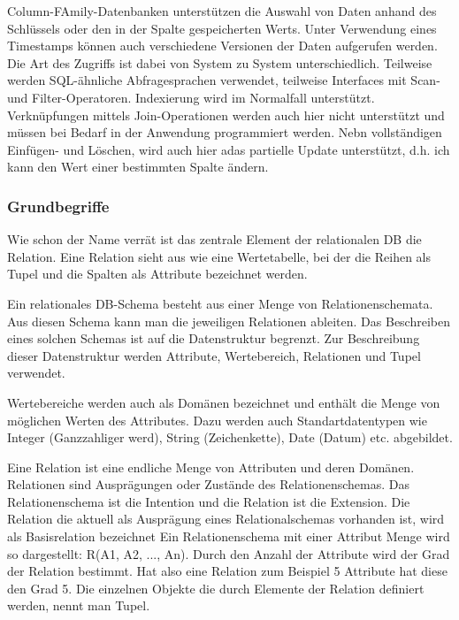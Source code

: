 \begin{flushleft}
Column-FAmily-Datenbanken unterstützen die Auswahl von Daten anhand des Schlüssels oder den in der Spalte gespeicherten Werts. Unter Verwendung eines Timestamps können auch verschiedene Versionen der Daten aufgerufen werden.  Die Art des Zugriffs ist dabei von System zu System unterschiedlich. Teilweise werden SQL-ähnliche Abfragesprachen verwendet, teilweise Interfaces mit Scan- und Filter-Operatoren. Indexierung wird im Normalfall unterstützt. Verknüpfungen mittels Join-Operationen werden auch hier nicht unterstützt und müssen bei Bedarf in der Anwendung programmiert werden. 
Nebn vollständigen Einfügen- und Löschen, wird auch hier adas partielle Update unterstützt, d.h. ich kann den Wert einer bestimmten Spalte ändern. 













\subsubsection{Grundbegriffe}

Wie schon der Name verrät ist das zentrale Element der relationalen DB die Relation. Eine Relation sieht aus wie eine Wertetabelle, bei der die Reihen als Tupel und die Spalten als Attribute bezeichnet werden. 

Ein relationales DB-Schema besteht aus einer Menge von Relationenschemata. Aus diesen Schema kann man die jeweiligen Relationen ableiten. Das Beschreiben eines solchen Schemas ist auf die Datenstruktur begrenzt. 
Zur Beschreibung dieser Datenstruktur werden Attribute, Wertebereich, Relationen und Tupel verwendet.



Wertebereiche werden auch als Domänen bezeichnet und enthält die Menge von möglichen Werten des Attributes. Dazu werden auch Standartdatentypen wie Integer (Ganzzahliger werd), String (Zeichenkette), Date (Datum) etc. abgebildet. 

Eine Relation ist eine endliche Menge von Attributen und deren Domänen. Relationen sind Ausprägungen oder Zustände des Relationenschemas. Das Relationenschema ist die Intention und die Relation ist die Extension. Die Relation die aktuell als Ausprägung eines Relationalschemas vorhanden ist, wird als Basisrelation bezeichnet Ein Relationenschema mit einer Attribut Menge wird so dargestellt: R(A1, A2, ..., An). Durch den Anzahl der Attribute wird der Grad der Relation bestimmt. Hat also eine Relation zum Beispiel 5 Attribute hat diese den Grad 5.  Die einzelnen Objekte die durch Elemente der Relation definiert werden, nennt man Tupel. 


\end{flushleft}
